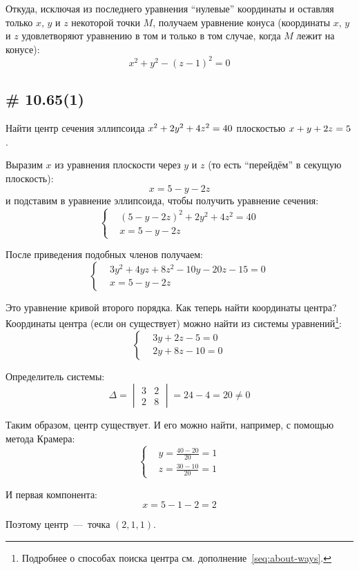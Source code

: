 \documentclass[a4paper,12pt]{article}
\begin{document}
\begin{solution}
    Откуда, исключая из последнего уравнения ``нулевые'' координаты и оставляя только $x$, $y$ и $z$ некоторой точки $M$, получаем уравнение конуса (координаты $x$, $y$ и $z$ удовлетворяют уравнению в том и только в том случае, когда $M$ лежит на конусе):
    \[
      x^2 + y^2 - (z - 1)^2 = 0
    \]
  \end{solution}


  \subsection{\# 10.65(1)}
  
  Найти центр сечения эллипсоида
  $
    x^2 \hm+ 2y^2 \hm+ 4z^2 \hm= 40
  $
  плоскостью
  $
    x + y + 2z \hm= 5
  $.
  
  \begin{solution}
    Выразим $x$ из уравнения плоскости через $y$ и $z$ (то есть ``перейдём'' в секущую плоскость):
    \[
      x = 5 - y - 2z
    \]
    и подставим в уравнение эллипсоида, чтобы получить уравнение сечения:
    \[
      \left\{
        \begin{aligned}
          &(5 - y - 2z)^2 + 2y^2 + 4z^2 = 40\\
          &x = 5 - y - 2z
        \end{aligned}
      \right.
    \]
    
    После приведения подобных членов получаем:
    \[
      \left\{
        \begin{aligned}
          &3y^2 + 4yz + 8z^2 - 10y - 20z - 15 = 0\\
          &x = 5 - y - 2z
        \end{aligned}
      \right.
    \]
    
    Это уравнение кривой второго порядка.
    Как теперь найти координаты центра?
    Координаты центра (если он существует) можно найти из системы уравнений\footnote{Подробнее о способах поиска центра см. дополнение~\ref{seq:about-ways}.}:
    \[
      \left\{
        \begin{aligned}
          &3y + 2z - 5 = 0\\
          &2y + 8z - 10 = 0
        \end{aligned}
      \right.
    \]
    
    Определитель системы:
    \[
      \Delta = \begin{vmatrix} 3 & 2 \\ 2 & 8 \end{vmatrix} = 24 - 4 = 20 \not= 0
    \]
    
    Таким образом, центр существует.
    И его можно найти, например, с помощью метода Крамера:
    \[
      \left\{
        \begin{aligned}
          &y = \frac{40 - 20}{20} = 1\\
          &z = \frac{30 - 10}{20} = 1
        \end{aligned}
      \right.
    \]
    
    И первая компонента:
    \[
      x = 5 - 1 - 2 = 2
    \]
    
    Поэтому центр~---~точка $(2, 1, 1)$.
  \end{solution}
  
\end{document}
